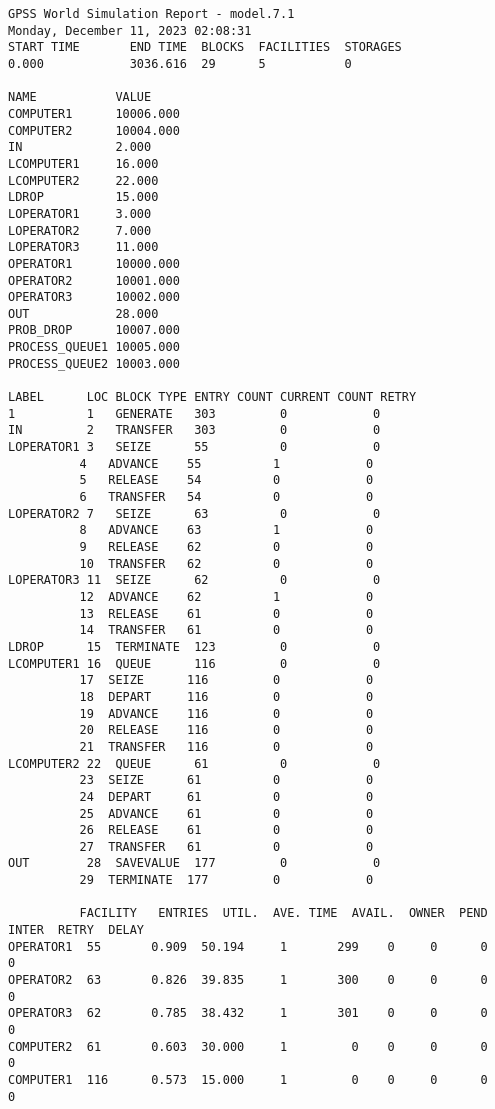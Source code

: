 \begin{lstlisting}[label=data50,caption=Результат работы программы для увеличенного времени работы первого оператора]
GPSS World Simulation Report - model.7.1
Monday, December 11, 2023 02:08:31
START TIME       END TIME  BLOCKS  FACILITIES  STORAGES
0.000            3036.616  29      5           0

NAME           VALUE  
COMPUTER1      10006.000
COMPUTER2      10004.000
IN             2.000
LCOMPUTER1     16.000
LCOMPUTER2     22.000
LDROP          15.000
LOPERATOR1     3.000
LOPERATOR2     7.000
LOPERATOR3     11.000
OPERATOR1      10000.000
OPERATOR2      10001.000
OPERATOR3      10002.000
OUT            28.000
PROB_DROP      10007.000
PROCESS_QUEUE1 10005.000
PROCESS_QUEUE2 10003.000

LABEL      LOC BLOCK TYPE ENTRY COUNT CURRENT COUNT RETRY
1          1   GENERATE   303         0            0
IN         2   TRANSFER   303         0            0
LOPERATOR1 3   SEIZE      55          0            0
          4   ADVANCE    55          1            0
          5   RELEASE    54          0            0
          6   TRANSFER   54          0            0
LOPERATOR2 7   SEIZE      63          0            0
          8   ADVANCE    63          1            0
          9   RELEASE    62          0            0
          10  TRANSFER   62          0            0
LOPERATOR3 11  SEIZE      62          0            0
          12  ADVANCE    62          1            0
          13  RELEASE    61          0            0
          14  TRANSFER   61          0            0
LDROP      15  TERMINATE  123         0            0
LCOMPUTER1 16  QUEUE      116         0            0
          17  SEIZE      116         0            0
          18  DEPART     116         0            0
          19  ADVANCE    116         0            0
          20  RELEASE    116         0            0
          21  TRANSFER   116         0            0
LCOMPUTER2 22  QUEUE      61          0            0
          23  SEIZE      61          0            0
          24  DEPART     61          0            0
          25  ADVANCE    61          0            0
          26  RELEASE    61          0            0
          27  TRANSFER   61          0            0
OUT        28  SAVEVALUE  177         0            0
          29  TERMINATE  177         0            0
          
          FACILITY   ENTRIES  UTIL.  AVE. TIME  AVAIL.  OWNER  PEND  INTER  RETRY  DELAY
OPERATOR1  55       0.909  50.194     1       299    0     0      0      0
OPERATOR2  63       0.826  39.835     1       300    0     0      0      0
OPERATOR3  62       0.785  38.432     1       301    0     0      0      0
COMPUTER2  61       0.603  30.000     1         0    0     0      0      0
COMPUTER1  116      0.573  15.000     1         0    0     0      0      0


\end{lstlisting}
